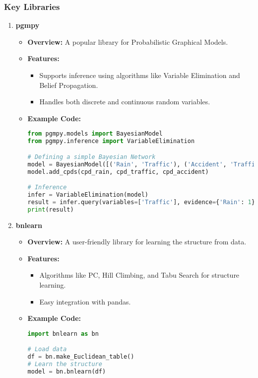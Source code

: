 \documentclass[aspectratio=169]{beamer}
\begin{document}
\begin{frame}[fragile]
    \frametitle{Key Libraries}
    \begin{enumerate}
        \item \textbf{pgmpy}
            \begin{itemize}
                \item \textbf{Overview:} A popular library for Probabilistic Graphical Models.
                \item \textbf{Features:}
                    \begin{itemize}
                        \item Supports inference using algorithms like Variable Elimination and Belief Propagation.
                        \item Handles both discrete and continuous random variables.
                    \end{itemize}
                \item \textbf{Example Code:}
                \begin{lstlisting}[language=Python]
from pgmpy.models import BayesianModel
from pgmpy.inference import VariableElimination

# Defining a simple Bayesian Network
model = BayesianModel([('Rain', 'Traffic'), ('Accident', 'Traffic')])
model.add_cpds(cpd_rain, cpd_traffic, cpd_accident)

# Inference
infer = VariableElimination(model)
result = infer.query(variables=['Traffic'], evidence={'Rain': 1})
print(result)
                \end{lstlisting}
            \end{itemize}
        
        \item \textbf{bnlearn}
            \begin{itemize}
                \item \textbf{Overview:} A user-friendly library for learning the structure from data.
                \item \textbf{Features:}
                    \begin{itemize}
                        \item Algorithms like PC, Hill Climbing, and Tabu Search for structure learning.
                        \item Easy integration with pandas.
                    \end{itemize}
                \item \textbf{Example Code:}
                \begin{lstlisting}[language=Python]
import bnlearn as bn

# Load data
df = bn.make_Euclidean_table()
# Learn the structure
model = bn.bnlearn(df)
                \end{lstlisting}
            \end{itemize}
    \end{enumerate}
\end{frame}
\end{document}
